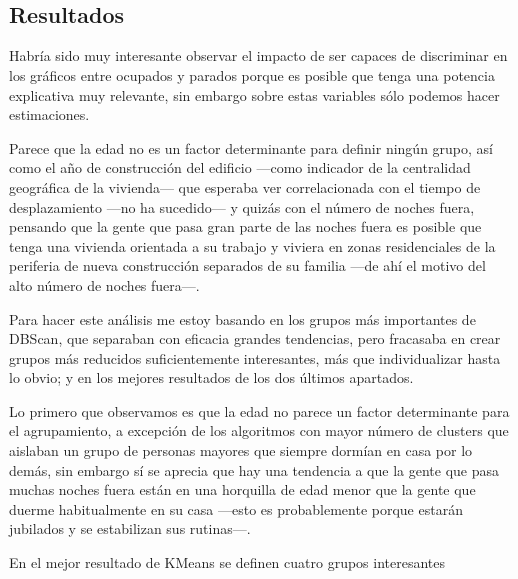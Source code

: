 \documentclass{article}
\newcommand{\img}[2]{
\noindent\makebox[\textwidth][c]{\texttt{[image: img/\#1]}}%
}
\begin{document}
\img{segNoches_spectral_tuned_box}{0.8}
\\

\img{segNoches_spectral_tuned_heat}{0.8}
\\

\img{segNoches_spectral_tuned_scatter}{0.8}

\subsection{Resultados}

Habría sido muy interesante observar el impacto de ser capaces de discriminar en los gráficos entre ocupados y parados porque es posible que tenga una potencia explicativa muy relevante, sin embargo sobre estas variables sólo podemos hacer estimaciones. 

Parece que la edad no es un factor determinante para definir ningún grupo, así como el año de construcción del edificio ---como indicador de la centralidad geográfica de la vivienda--- que esperaba ver correlacionada con el tiempo de desplazamiento ---no ha sucedido--- y quizás con el número de noches fuera, pensando que la gente que pasa gran parte de las noches fuera es posible que tenga una vivienda orientada a su trabajo y viviera en zonas residenciales de la periferia de nueva construcción separados de su familia ---de ahí el motivo del alto número de noches fuera---.

Para hacer este análisis me estoy basando en los grupos más importantes de DBScan, que separaban con eficacia grandes tendencias, pero fracasaba en crear grupos más reducidos suficientemente interesantes, más que individualizar hasta lo obvio; y en los mejores resultados de los dos últimos apartados.

Lo primero que observamos es que la edad no parece un factor determinante para el agrupamiento, a excepción de los algoritmos con mayor número de clusters que aislaban un grupo de personas mayores que siempre dormían en casa por lo demás, sin embargo sí se aprecia que hay una tendencia a que la gente que pasa muchas noches fuera están en una horquilla de edad menor que la gente que duerme habitualmente en su casa ---esto es probablemente porque estarán jubilados y se estabilizan sus rutinas---.

En el mejor resultado de KMeans se definen cuatro grupos interesantes
\end{document}
